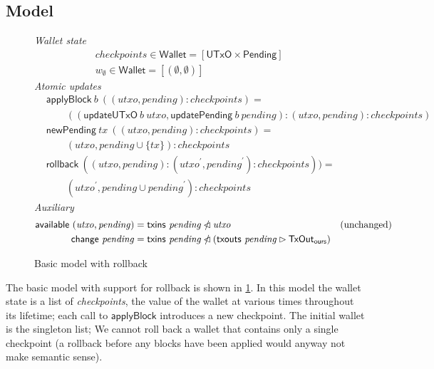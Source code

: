 \documentclass{article}
\newcommand{\restrictdom}{\lhd}
\newcommand{\subtractdom}{\mathbin{\slashed{\restrictdom}}}
\newcommand{\restrictrange}{\rhd}
\theoremstyle{definition}{
  \newtheorem{lemma}{Lemma}[section] %
  \newtheorem{definition}[lemma]{Definition}
}
\theoremstyle{theorem}{
  \newtheorem{invariant}[lemma]{Invariant}
  \newtheorem{proofobligation}[lemma]{Proof Obligation}
}
\numberwithin{equation}{lemma}
\begin{document}
\subsection{Model}

\begin{figure}
%
\emph{Wallet state}
%
\begin{align*}
& \mathit{checkpoints} \in \mathsf{Wallet} = [\mathsf{UTxO} \times \mathsf{Pending}] \\
& w_\emptyset \in \mathsf{Wallet} = [(\emptyset, \emptyset)]
\end{align*}
%
\emph{Atomic updates}
%
\begin{align*}
& \mathsf{applyBlock} ~ b ~ ((\mathit{utxo}, \mathit{pending}) : \mathit{checkpoints}) = \\
& \qquad (( \mathsf{updateUTxO} ~ b ~ \mathit{utxo}
         , \mathsf{updatePending} ~ b ~ \mathit{pending}
         )
         : (\mathit{utxo}, \mathit{pending}) : \mathit{checkpoints}
         ) \\
& \mathsf{newPending} ~ \mathit{tx} ~ ((\mathit{utxo}, \mathit{pending}) : \mathit{checkpoints}) = \\
& \qquad (\mathit{utxo}, \mathit{pending} \cup \{ \mathit{tx} \} ) : \mathit{checkpoints} \\
& \mathsf{rollback} ~ ((\mathit{utxo}, \mathit{pending}) :  (\mathit{utxo}^\prime, \mathit{pending}^\prime) : \mathit{checkpoints})) = \\
& \qquad (\mathit{utxo}^\prime, \mathit{pending} \cup \mathit{pending}^\prime) : \mathit{checkpoints}
\end{align*}
%
\emph{Auxiliary}
%
\begin{align*}
\mathsf{available} ~ (\mathit{utxo}, \mathit{pending})
   & = \mathsf{txins} ~ \mathit{pending} \subtractdom \mathit{utxo} & \text{(unchanged)} \\
\mathsf{change} ~ \mathit{pending}
   & = \mathsf{txins} ~ \mathit{pending} \subtractdom (\mathsf{txouts} ~ \mathit{pending} \restrictrange \mathsf{TxOut_{ours}})
\end{align*}
%
\caption{\label{fig:basic_rollback_model}Basic model with rollback}
\end{figure}

The basic model with support for rollback is shown in
\cref{fig:basic_rollback_model}. In this model the wallet state is a list
of \emph{checkpoints}, the value of the wallet at various times throughout its
lifetime; each call to $\mathsf{applyBlock}$ introduces a new checkpoint. The
initial wallet is the singleton list; We cannot roll back a wallet that contains
only a single checkpoint (a rollback before any blocks have been applied would
anyway not make semantic sense).
\end{document}

